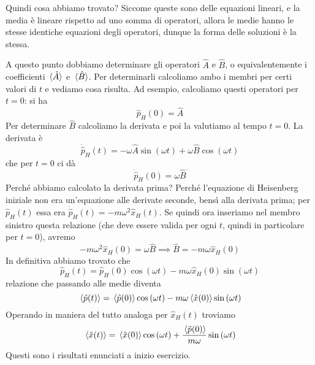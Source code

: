 \begin{soluzione}
   Quindi cosa abbiamo trovato? Siccome queste sono delle equazioni lineari, e la media è lineare rispetto ad uno somma di operatori, allora le medie hanno le stesse identiche equazioni degli operatori, dunque la forma delle soluzioni è la stessa.
   
   A questo punto dobbiamo determinare gli operatori $\hat{A}$ e $\hat{B}$, o equivalentemente i coefficienti $\expval*{\hat{A}}$ e $\expval*{\hat{B}}$. Per determinarli calcoliamo ambo i membri per certi valori di $t$ e vediamo cosa risulta. Ad esempio, calcoliamo questi operatori per $t=0$: si ha
   \begin{equation*}
      \hat{p}_H(0)
      =\hat{A}
   \end{equation*}
   Per determinare $\hat{B}$ calcoliamo la derivata e poi la valutiamo al tempo $t=0$. La derivata è
   \begin{equation*}
      \dot{\hat{p}}_H(t)=-\omega\hat{A}\sin{(\omega t)} + \omega\hat{B}\cos{(\omega t)}
   \end{equation*}
   che per $t=0$ ci dà
   \begin{equation*}
      \dot{\hat{p}}_H(0)=\omega\hat{B}
   \end{equation*}
   Perché abbiamo calcolato la derivata prima? Perché l'equazione di Heisenberg iniziale non era un'equazione alle derivate seconde, bensì alla derivata prima; per $\hat{p}_H(t)$ essa era $\dot{\hat{p}}_H(t)=-m\omega^2 \hat{x}_H(t)$. Se quindi ora inseriamo nel membro sinistro questa relazione (che deve essere valida per ogni $t$, quindi in particolare per $t=0$), avremo
   \begin{equation*}
      -m\omega^2 \hat{x}_H(0)=\omega\hat{B}
      \implies
      \hat{B}=-m\omega \hat{x}_H(0)
   \end{equation*}
   In definitiva abbiamo trovato che
   \begin{equation*}
      \hat{p}_H(t)
      =\hat{p}_H(0)\cos{(\omega t)} - m\omega\hat{x}_H(0)\sin{(\omega t)}
   \end{equation*}
   relazione che passando alle medie diventa
   \begin{equation*}
      \expval*{\hat{p}(t)}
      =\expval*{\hat{p}(0)}\cos{(\omega t)} - m\omega\expval*{\hat{x}(0)}\sin{(\omega t)}
   \end{equation*}
   Operando in maniera del tutto analoga per $\hat{x}_H(t)$ troviamo
   \begin{equation*}
      \expval*{\hat{x}(t)}
      =\expval*{\hat{x}(0)}\cos{(\omega t)} + \frac{\expval*{\hat{p}(0)}}{m\omega}\sin{(\omega t)}
   \end{equation*}
   Questi sono i risultati enunciati a inizio esercizio.\\


\end{soluzione}
